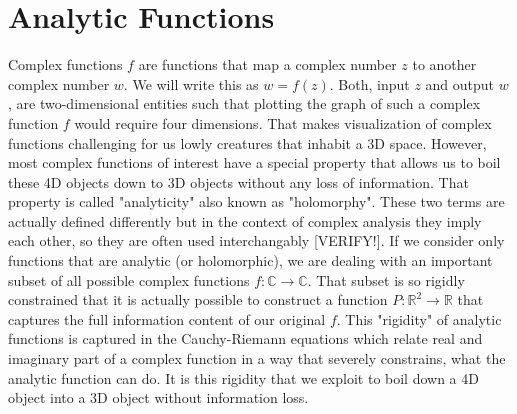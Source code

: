 \documentclass[12pt]{article}
\begin{document}
\section{Analytic Functions}
Complex functions $f$ are functions that map a complex number $z$ to another complex number $w$. We will write this as $w = f(z)$. Both, input $z$ and output $w$, are two-dimensional entities such that plotting the graph of such a complex function $f$ would require four dimensions. That makes visualization of complex functions challenging for us lowly creatures that inhabit a 3D space. However, most complex functions of interest have a special property that allows us to boil these 4D objects down to 3D objects without any loss of information. That property is called "analyticity" also known as "holomorphy". These two terms are actually defined differently but in the context of complex analysis they imply each other, so they are often used interchangably [VERIFY!]. If we consider only functions that are analytic (or holomorphic), we are dealing with an important subset of all possible complex functions $f: \mathbb{C} \rightarrow \mathbb{C}$. That subset is so rigidly constrained that it is actually possible to construct a function $P: \mathbb{R}^2 \rightarrow \mathbb{R}$ that captures the full information content of our original $f$. This "rigidity" of analytic functions is captured in the  Cauchy-Riemann equations which relate real and imaginary part of a complex function in a way that severely constrains, what the analytic function can do. It is this rigidity that we exploit to boil down a 4D object into a 3D object without information loss.

\end{document}
